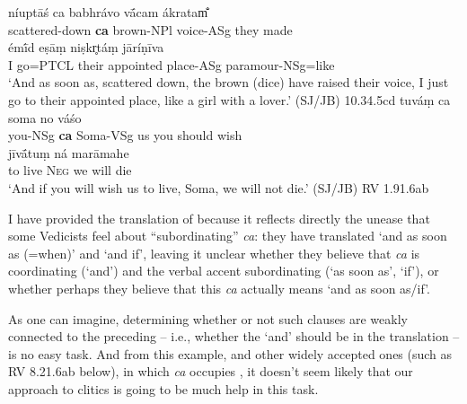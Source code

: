 \documentclass[output=paper,
modfonts
]{LSP/langsci}
\begin{document}
\begin{exe}
\ex\label{2Psubca}
	\begin{xlist}
	\ex\gll níuptāś ca babhrávo vā́cam ákratam̐ \\
			scattered-down \textbf{ca} brown-NPl voice-ASg {they made}\\
			
		\gll émī́d eṣāṃ niṣkr̥táṃ jāríṇīva \\
			 {I go=PTCL} their {appointed place-ASg} {paramour-NSg}=like \\
		\glt `And as soon as, scattered down, the brown (dice) have raised their voice, I just go to their appointed place, like a girl with a lover.' (SJ/JB)		\hfill {10.34.5cd}
	\ex\gll tuváṃ ca soma no váśo\\
			you-NSg \textbf{ca} Soma-VSg us {you should wish}\\

		\gll jīvā́tuṃ ná marāmahe \\
			 {to live} \textsc{Neg} {we will die} \\
		\glt `And if you will wish us to live, Soma, we will not die.' (SJ/JB)		\hfill {RV 1.91.6ab}
	\end{xlist}
\end{exe}

\noindent I have provided the translation of \citet{jamison2014} because it reflects directly the unease
that some Vedicists feel about ``subordinating'' \textit{ca}: they have translated `and as soon as (=when)' and
`and if', leaving
it unclear whether they believe that \textit{ca} is coordinating (`and') and the verbal accent
subordinating (`as soon as', `if'), or whether perhaps they believe that this \textit{ca} actually means `and as soon as/if'.

As one can imagine, determining whether or not such clauses are weakly connected to the preceding
 -- i.e., whether the `and' should be in the  translation -- is no easy task. And from
this example, and other widely accepted ones (such as RV 8.21.6ab below), in which \textit{ca} occupies
, it doesn't seem likely that our approach to clitics is going to be much help
in this task.

\end{document}
